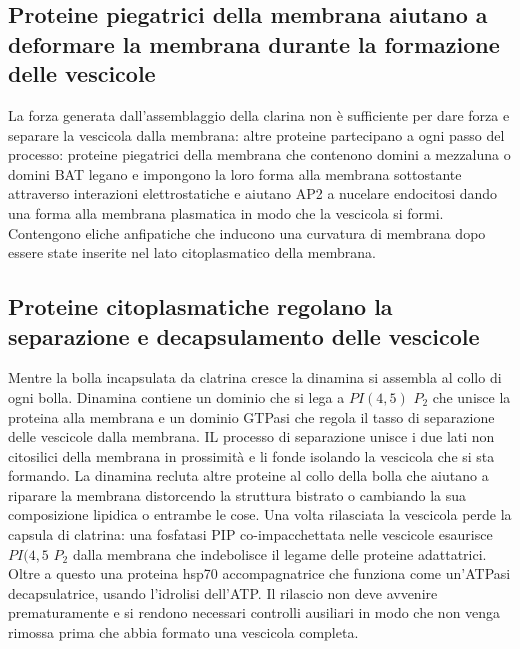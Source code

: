 \subsection{Proteine piegatrici della membrana aiutano a deformare la membrana durante la formazione delle vescicole}
La forza generata dall'assemblaggio della clarina non \`e sufficiente per dare forza e separare la vescicola dalla membrana: altre proteine partecipano a ogni passo del processo:
proteine piegatrici della membrana che contenono  domini a mezzaluna o domini BAT legano e impongono la loro forma alla membrana sottostante attraverso interazioni elettrostatiche e 
aiutano AP2 a nucelare endocitosi dando una forma alla membrana plasmatica in modo che la vescicola si formi. Contengono eliche anfipatiche che inducono una curvatura di membrana
dopo essere state inserite nel lato citoplasmatico della membrana.
\subsection{Proteine citoplasmatiche regolano la separazione e decapsulamento delle vescicole}
Mentre la bolla incapsulata da clatrina cresce la dinamina si assembla al collo di ogni bolla. Dinamina contiene un dominio che si lega a $PI(4,5)$ $P_2$ che unisce la proteina alla
membrana e un dominio GTPasi che regola il tasso di separazione delle vescicole dalla membrana. IL processo di separazione unisce i due lati non citosilici della membrana in prossimit\`a
e li fonde isolando la vescicola che si sta formando. La dinamina recluta altre proteine al collo della bolla che aiutano a riparare la membrana distorcendo la struttura bistrato o 
cambiando la sua composizione lipidica o entrambe le cose. Una volta rilasciata la vescicola perde la capsula di clatrina: una fosfatasi PIP co-impacchettata nelle vescicole esaurisce
$PI(4, 5$ $P_2$ dalla membrana che indebolisce il legame delle proteine adattatrici. Oltre a questo una proteina hsp70 accompagnatrice che funziona come un'ATPasi decapsulatrice, usando
l'idrolisi dell'ATP. Il rilascio non deve avvenire prematuramente e si rendono necessari controlli ausiliari in modo che non venga rimossa prima che abbia formato una vescicola completa.
